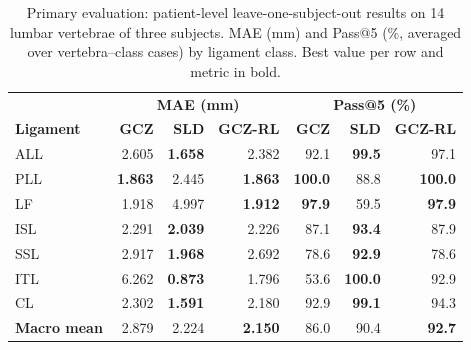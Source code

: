 \documentclass[5p,times,twocolumn,authoryear]{elsarticle}
\begin{document}
\begin{table}[!t]
\centering
\caption{Primary evaluation: patient-level leave-one-subject-out results on 14 lumbar vertebrae of three subjects. MAE (mm) and Pass@5 (\%, averaged over vertebra--class cases) by ligament class. Best value per row and metric in bold.}
\label{tab:loso_ligament}
\renewcommand{\arraystretch}{1.12}
\small
\begin{tabular}{@{}lrrrrrr@{}}
\toprule
 & \multicolumn{3}{c}{\textbf{MAE (mm)}} & \multicolumn{3}{c}{\textbf{Pass@5 (\%)}} \\
\cmidrule(lr){2-4}\cmidrule(lr){5-7}
\textbf{Ligament} & \textbf{GCZ} & \textbf{SLD} & \textbf{GCZ-RL} & \textbf{GCZ} & \textbf{SLD} & \textbf{GCZ-RL} \\
\midrule
ALL & 2.605 & \textbf{1.658} & 2.382 & 92.1 & \textbf{99.5} & 97.1 \\
PLL & \textbf{1.863} & 2.445 & \textbf{1.863} & \textbf{100.0} & 88.8 & \textbf{100.0} \\
LF  & 1.918 & 4.997 & \textbf{1.912} & \textbf{97.9} & 59.5 & \textbf{97.9} \\
ISL & 2.291 & \textbf{2.039} & 2.226 & 87.1 & \textbf{93.4} & 87.9 \\
SSL & 2.917 & \textbf{1.968} & 2.692 & 78.6 & \textbf{92.9} & 78.6 \\
ITL & 6.262 & \textbf{0.873} & 1.796 & 53.6 & \textbf{100.0} & 92.9 \\
CL  & 2.302 & \textbf{1.591} & 2.180 & 92.9 & \textbf{99.1} & 94.3 \\
\midrule
\textbf{Macro mean} & 2.879 & 2.224 & \textbf{2.150} & 86.0 & 90.4 & \textbf{92.7} \\
\bottomrule
\end{tabular}
\end{table}

\begin{table}[!t]
\centering
\caption{Primary evaluation by held-out subject: macro average over classes of the mean Euclidean error (mm). Training counts apply to GCZ and GCZ-RL; SLD has no training step. Lowest MAE per row in bold.}
\label{tab:loso_subject}
\renewcommand{\arraystretch}{1.12}
\scriptsize
{}
\end{table}
\end{document}
